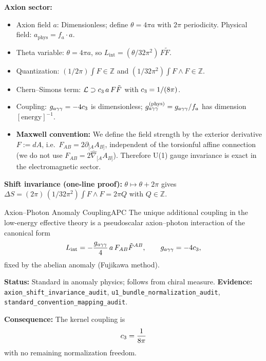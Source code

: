 \begin{tcolorbox}[colback=yellow!5, colframe=yellow!60!black, 
    title={\textbf{Conventions: Units, Masses, and Normalizations}}, fonttitle=\bfseries]
\textbf{Axion sector:}
\begin{itemize}[leftmargin=1.5em, topsep=2pt, itemsep=1pt]
    \item Axion field $a$: Dimensionless; define $\theta = 4\pi a$ with $2\pi$ periodicity. Physical field: $a_{\text{phys}} = f_a \cdot a$.
    \item Theta variable: $\theta = 4\pi a$, so $L_{\mathrm{int}} = (\theta/32\pi^2)\,F\tilde{F}$.
    \item Quantization: $(1/2\pi)\int F \in \mathbb{Z}$ and $(1/32\pi^2)\int F\wedge F \in \mathbb{Z}$.
    \item Chern--Simons term: $\mathcal{L} \supset c_3\, a\, F\tilde{F}$ with $c_3 = 1/(8\pi)$.
    \item Coupling: $g_{a\gamma\gamma} = -4c_3$ is dimensionless; $g_{a\gamma\gamma}^{\text{(phys)}} = g_{a\gamma\gamma} / f_a$ has dimension $[\text{energy}]^{-1}$.
    \item \textbf{Maxwell convention:} We define the field strength by the exterior derivative $F := dA$, i.e.\ $F_{AB}=2\partial_{[A}A_{B]}$, independent of the torsionful affine connection (we do not use $F_{AB}=2\hat{\nabla}_{[A}A_{B]}$). Therefore U(1) gauge invariance is exact in the electromagnetic sector.
\end{itemize}
\textbf{Shift invariance (one-line proof):} $\theta\mapsto \theta+2\pi$ gives $\Delta S=(2\pi)\,(1/32\pi^2)\int F\wedge F=2\pi Q$ with $Q\in\mathbb{Z}$.
\end{tcolorbox}

\begin{axiom}{Axion--Photon Anomaly Coupling}{APC}
The unique additional coupling in the low-energy effective theory is a 
pseudoscalar axion--photon interaction of the canonical form
\[
L_{\mathrm{int}}=-\frac{g_{a\gamma\gamma}}{4}\,a\,F_{AB}\tilde{F}^{AB},
\qquad g_{a\gamma\gamma}=-4c_3,
\]
fixed by the abelian anomaly (Fujikawa method).

\tcblower
\textbf{Status:} Standard in anomaly physics; follows from chiral measure.
\textbf{Evidence:} \texttt{axion\_shift\_invariance\_audit}, \texttt{u1\_bundle\_normalization\_audit}, \texttt{standard\_convention\_mapping\_audit}.

\textbf{Consequence:} The kernel coupling is
\begin{equation}
    c_3 = \frac{1}{8\pi}
\end{equation}
with no remaining normalization freedom.
\end{axiom}

